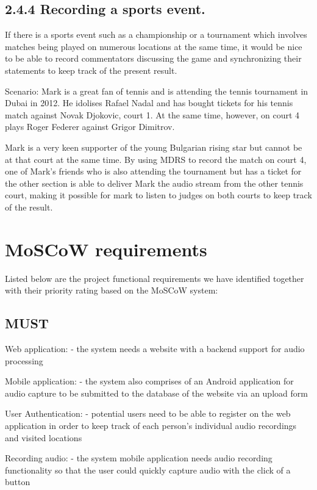 \documentclass{l3proj}
\begin{document}
\subsection{2.4.4 Recording a sports event.} If there is a sports event such as a championship or a tournament which involves matches being played on numerous locations at the same time, it would be nice to be able to record commentators discussing the game and synchronizing their statements to keep track of the present result.

Scenario: Mark is a great fan of tennis and is attending the tennis tournament in Dubai in 2012. He idolises Rafael Nadal and has bought tickets for his tennis match against Novak Djokovic, court 1. At the same time, however, on court 4 plays Roger Federer against Grigor Dimitrov. 

Mark is a very keen supporter of the young Bulgarian rising star but cannot be at that court at the same time. By using MDRS to record the match on court 4, one of Mark’s friends who is also attending the tournament but has a ticket for the other section is able to deliver Mark the audio stream from the other tennis court, making it possible for mark to listen to judges on both courts to keep track of the result.




\section{MoSCoW requirements}

Listed below are the project functional requirements we have identified together with their priority rating based on the MoSCoW system:

	\subsection{MUST}
		Web application:
			- the system needs a website with a backend support for audio processing

		Mobile application:
			- the system also comprises of an Android application for audio capture to be submitted to the database of the website via an upload form

		User Authentication:
			- potential users need to be able to register on the web application in order to keep track of each person's individual audio recordings and visited locations

		Recording audio:
			- the system mobile application needs audio recording functionality so that the user could quickly capture audio with the click of a button
\end{document}
